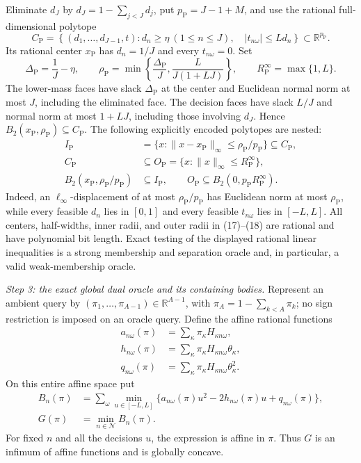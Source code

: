 Eliminate \(d_J\) by \(d_J=1-\sum_{j<J}d_j\), put \(p_{\mathrm P}=J-1+M\), and use the rational full-dimensional polytope
\[
 C_{\mathrm P}=\left\{(d_1,\ldots,d_{J-1},t):
 d_n\ge\eta\ (1\le n\le J),\quad
 |t_{n\omega}|\le Ld_n\right\}\subset\mathbb R^{p_{\mathrm P}}.
\tag{16}
\]
Its rational center \(x_{\mathrm P}\) has \(d_n=1/J\) and every \(t_{n\omega}=0\).  Set
\[
 \Delta_{\mathrm P}=\frac1J-\eta,
 \qquad
 \rho_{\mathrm P}=\min\left\{\frac{\Delta_{\mathrm P}}J,
                 \frac{L}{J(1+LJ)}\right\},
 \qquad R_{\mathrm P}^{\infty}=\max\{1,L\}.
\tag{17}
\]
The lower-mass faces have slack \(\Delta_{\mathrm P}\) at the center and Euclidean normal norm at most \(J\), including the eliminated face.  The decision faces have slack \(L/J\) and normal norm at most \(1+LJ\), including those involving \(d_J\).  Hence \(B_2(x_{\mathrm P},\rho_{\mathrm P})\subseteq C_{\mathrm P}\).  The following explicitly encoded polytopes are nested:
\[
 \begin{split}
 I_{\mathrm P}
   &=\{x:\|x-x_{\mathrm P}\|_\infty\le\rho_{\mathrm P}/p_{\mathrm P}\}
     \subseteq C_{\mathrm P},\\
 C_{\mathrm P}&\subseteq
 O_{\mathrm P}=\{x:\|x\|_\infty\le R_{\mathrm P}^{\infty}\},\\
 B_2(x_{\mathrm P},\rho_{\mathrm P}/p_{\mathrm P})
   &\subseteq I_{\mathrm P},
 \qquad
 O_{\mathrm P}\subseteq B_2(0,p_{\mathrm P}R_{\mathrm P}^{\infty}).
 \end{split}
\tag{18}
\]
Indeed, an \(\ell_\infty\)-displacement of at most \(\rho_{\mathrm P}/p_{\mathrm P}\) has Euclidean norm at most \(\rho_{\mathrm P}\), while every feasible \(d_n\) lies in \([0,1]\) and every feasible \(t_{n\omega}\) lies in \([-L,L]\).  All centers, half-widths, inner radii, and outer radii in (17)--(18) are rational and have polynomial bit length.  Exact testing of the displayed rational linear inequalities is a strong membership and separation oracle and, in particular, a valid weak-membership oracle.

\emph{Step 3: the exact global dual oracle and its containing bodies.}
Represent an ambient query by \((\pi_1,\ldots,\pi_{A-1})\in\mathbb R^{A-1}\), with \(\pi_A=1-\sum_{k<A}\pi_k\); no sign restriction is imposed on an oracle query.  Define the affine rational functions
\[
 \begin{split}
 a_{n\omega}(\pi)&=\sum_\kappa\pi_\kappa H_{\kappa n\omega},\\
 h_{n\omega}(\pi)&=\sum_\kappa\pi_\kappa H_{\kappa n\omega}\theta_\kappa,\\
 q_{n\omega}(\pi)&=\sum_\kappa\pi_\kappa H_{\kappa n\omega}\theta_\kappa^2.
 \end{split}
\tag{19}
\]
On this entire affine space put
\[
 \begin{split}
 B_n(\pi)&=\sum_\omega\min_{u\in[-L,L]}
 \{a_{n\omega}(\pi)u^2-2h_{n\omega}(\pi)u+q_{n\omega}(\pi)\},\\
 G(\pi)&=\min_{n\in\mathcal N}B_n(\pi).
 \end{split}
\tag{20}
\]
For fixed \(n\) and all the decisions \(u\), the expression is affine in \(\pi\).  Thus \(G\) is an infimum of affine functions and is globally concave.

